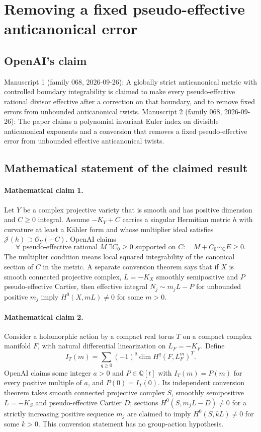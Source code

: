 \documentclass[11pt]{article}
\begin{document}
\section*{Removing a fixed pseudo-effective anticanonical error}

\subsection{OpenAI's claim}
Manuscript 1 (family 068, 2026-09-26): A globally strict anticanonical metric with controlled boundary integrability is claimed to make every pseudo-effective rational divisor effective after a correction on that boundary, and to remove fixed errors from unbounded anticanonical twists. Manuscript 2 (family 068, 2026-09-26): The paper claims a polynomial invariant Euler index on divisible anticanonical exponents and a conversion that removes a fixed pseudo-effective error from unbounded effective anticanonical twists.

\subsection{Mathematical statement of the claimed result}
\paragraph{Mathematical claim 1.} Let $Y$ be a complex projective variety that is smooth and has positive dimension and $C\ge0$ integral. Assume $-K_Y+C$ carries a singular Hermitian metric $h$ with curvature at least a Kähler form and whose multiplier ideal satisfies $\mathcal J(h)\supset\mathcal O_Y(-C)$. OpenAI claims
\[
\forall\text{ pseudo-effective rational }M\ \exists C_0\ge0\text{ supported on }C:\quad M+C_0\sim_{\mathbb Q}E\ge0.
\]
The multiplier condition means local squared integrability of the canonical section of $C$ in the metric. A separate conversion theorem says that if $X$ is smooth connected projective complex, $L=-K_X$ smoothly semipositive and $P$ pseudo-effective Cartier, then effective integral $N_j\sim m_jL-P$ for unbounded positive $m_j$ imply $H^0(X,mL)\ne0$ for some $m>0$.

\paragraph{Mathematical claim 2.} Consider a holomorphic action by a compact real torus $T$ on a compact complex manifold $F$, with natural differential linearization on $L_F=-K_F$. Define
\[
I_T(m)=\sum_{q\ge0}(-1)^q\dim H^q(F,L_F^m)^T.
\]
OpenAI claims some integer $a>0$ and $P\in\mathbb Q[t]$ with $I_T(m)=P(m)$ for every positive multiple of $a$, and $P(0)=I_T(0)$.
Its independent conversion theorem takes smooth connected projective complex $S$, smoothly semipositive $L=-K_S$ and pseudo-effective Cartier $D$; sections $H^0(S,m_jL-D)\ne0$ for a strictly increasing positive sequence $m_j$ are claimed to imply $H^0(S,kL)\ne0$ for some $k>0$. This conversion statement has no group-action hypothesis.
\end{document}
